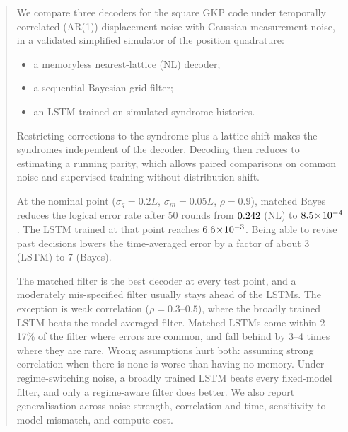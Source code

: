 \begin{abstract}
We compare three decoders for the square GKP code under temporally correlated
(AR(1)) displacement noise with Gaussian measurement noise, in a validated
simplified simulator of the position quadrature:
\begin{itemize}
  \item a memoryless nearest-lattice (NL) decoder;
  \item a sequential Bayesian grid filter;
  \item an LSTM trained on simulated syndrome histories.
\end{itemize}
Restricting corrections to the syndrome plus a lattice shift makes the
syndromes independent of the decoder. Decoding then reduces to estimating a
running parity, which allows paired comparisons on common noise and
supervised training without distribution shift.

At the nominal point ($\sigma_q=0.2L$, $\sigma_m=0.05L$, $\rho=0.9$), matched
Bayes reduces the logical error rate after 50 rounds from $\EoneNLLERfifty$
(NL) to $\EoneBayesLERfifty$. The LSTM trained at that point reaches
$\EoneLSTMnomLERfifty$. Being able to revise past decisions lowers the time-averaged
error by a factor of about 3 (LSTM) to 7 (Bayes).

The matched filter is the best decoder at every test point, and a moderately
mis-specified filter usually stays ahead of the LSTMs. The exception is weak
correlation ($\rho=0.3$--$0.5$), where the broadly trained LSTM beats the
model-averaged filter. Matched LSTMs come within 2--17\% of the filter where
errors are common, and fall behind by 3--4 times where they are rare. Wrong assumptions hurt both: assuming strong correlation
when there is none is worse than having no memory. Under regime-switching
noise, a broadly trained LSTM beats every fixed-model filter, and only a
regime-aware filter does better. We also report generalisation across noise
strength, correlation and time, sensitivity to model mismatch, and compute
cost.
\end{abstract}
